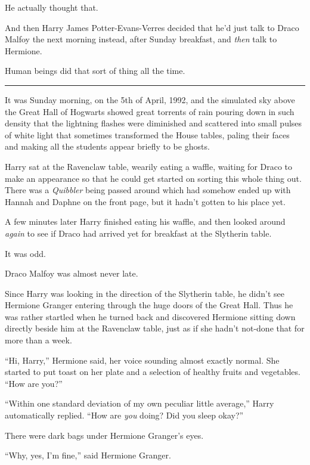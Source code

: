 He actually thought that.

And then Harry James Potter-Evans-Verres decided that he'd just talk to
Draco Malfoy the next morning instead, after Sunday breakfast, and
\emph{then} talk to Hermione.

Human beings did that sort of thing all the time.

\begin{center}\rule{3in}{0.4pt}\end{center}

It was Sunday morning, on the 5th of April, 1992, and the simulated sky
above the Great Hall of Hogwarts showed great torrents of rain pouring
down in such density that the lightning flashes were diminished and
scattered into small pulses of white light that sometimes transformed
the House tables, paling their faces and making all the students appear
briefly to be ghosts.

Harry sat at the Ravenclaw table, wearily eating a waffle, waiting for
Draco to make an appearance so that he could get started on sorting this
whole thing out. There was a \emph{Quibbler} being passed around which
had somehow ended up with Hannah and Daphne on the front page, but it
hadn't gotten to his place yet.

A few minutes later Harry finished eating his waffle, and then looked
around \emph{again} to see if Draco had arrived yet for breakfast at the
Slytherin table.

It was odd.

Draco Malfoy was almost never late.

Since Harry was looking in the direction of the Slytherin table, he
didn't see Hermione Granger entering through the huge doors of the Great
Hall. Thus he was rather startled when he turned back and discovered
Hermione sitting down directly beside him at the Ravenclaw table, just
as if she hadn't not-done that for more than a week.

``Hi, Harry,'' Hermione said, her voice sounding almost exactly normal.
She started to put toast on her plate and a selection of healthy fruits
and vegetables. ``How are you?''

``Within one standard deviation of my own peculiar little average,''
Harry automatically replied. ``How are \emph{you} doing? Did you sleep
okay?''

There were dark bags under Hermione Granger's eyes.

``Why, yes, I'm fine,'' said Hermione Granger.

